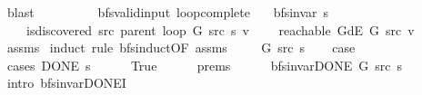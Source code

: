 \begin{isabellebody}
\ blast\isanewline
\ \ \ \ \isamarkupfalse%
\isanewline
\ \ \isamarkupfalse%
\isanewline
{}\isamarkupfalse%
%
\endisatagproof
{\isafoldproof}%
%
\isadelimproof
\isanewline
%
\endisadelimproof
\isanewline
{}\isamarkupfalse%
\ {\isacharparenleft}{\kern0pt}\ bfs{\isacharunderscore}{\kern0pt}valid{\isacharunderscore}{\kern0pt}input{\isacharparenright}{\kern0pt}\ loop{\isacharunderscore}{\kern0pt}complete{\isacharcolon}{\kern0pt}\isanewline
\ \ \ {\isachardoublequoteopen}bfs{\isacharunderscore}{\kern0pt}invar{\isacharprime}{\kern0pt}{\isacharprime}{\kern0pt}\ s{\isachardoublequoteclose}\isanewline
\ \ \ {\isachardoublequoteopen}{\isasymnot}\ is{\isacharunderscore}{\kern0pt}discovered\ src\ {\isacharparenleft}{\kern0pt}parent\ {\isacharparenleft}{\kern0pt}loop\ G\ src\ s{\isacharparenright}{\kern0pt}{\isacharparenright}{\kern0pt}\ v{\isachardoublequoteclose}\isanewline
\ \ \ {\isachardoublequoteopen}{\isasymnot}\ reachable\ {\isacharparenleft}{\kern0pt}G{\isachardot}{\kern0pt}dE\ G{\isacharparenright}{\kern0pt}\ src\ v{\isachardoublequoteclose}\isanewline
%
\isadelimproof
\ \ %
\endisadelimproof
%
\isatagproof
{}\isamarkupfalse%
\ assms\isanewline
{}\isamarkupfalse%
\ {\isacharparenleft}{\kern0pt}induct\ rule{\isacharcolon}{\kern0pt}\ bfs{\isacharunderscore}{\kern0pt}induct{\isacharbrackleft}{\kern0pt}OF\ assms{\isacharparenleft}{\kern0pt}{}{\isacharparenright}{\kern0pt}{\isacharbrackright}{\kern0pt}{\isacharparenright}{\kern0pt}\isanewline
\ \ \isamarkupfalse%
\ {\isacharparenleft}{\kern0pt}{}\ G\ src\ s{\isacharparenright}{\kern0pt}\isanewline
\ \ \isamarkupfalse%
\ {\isacharquery}{\kern0pt}case\isanewline
\ \ \isamarkupfalse%
\ {\isacharparenleft}{\kern0pt}cases\ {\isachardoublequoteopen}DONE\ s{\isachardoublequoteclose}{\isacharparenright}{\kern0pt}\isanewline
\ \ \ \ \isamarkupfalse%
\ True\isanewline
\ \ \ \ \isamarkupfalse%
\ {\isachardoublequoteopen}{}{\isachardot}{\kern0pt}prems{\isachardoublequoteclose}{\isacharparenleft}{\kern0pt}{}{\isacharparenright}{\kern0pt}\isanewline
\ \ \ \ \isamarkupfalse%
\ {\isachardoublequoteopen}bfs{\isacharunderscore}{\kern0pt}invar{\isacharunderscore}{\kern0pt}DONE{\isacharprime}{\kern0pt}\ G\ src\ s{\isachardoublequoteclose}\isanewline
\ \ \ \ \ \ \isamarkupfalse%
\ {\isacharparenleft}{\kern0pt}intro\ bfs{\isacharunderscore}{\kern0pt}invar{\isacharunderscore}{\kern0pt}DONE{\isacharprime}{\kern0pt}I{\isacharparenright}{\kern0pt}\isanewline

\end{isabellebody}
